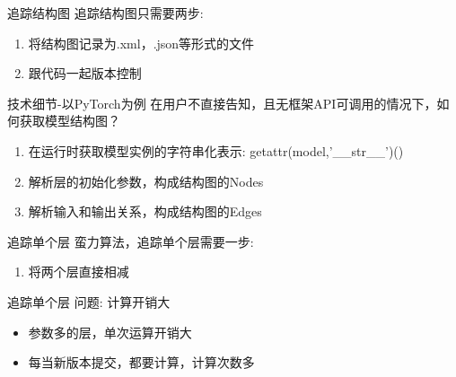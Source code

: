 \documentclass{beamer}
\begin{document}
\begin{frame}{追踪结构图}
追踪结构图只需要两步:
\begin{enumerate}
    \item 将结构图记录为.xml，.json等形式的文件
    \item 跟代码一起版本控制
\end{enumerate}
\end{frame}

\begin{frame}{技术细节-以PyTorch为例}
在用户不直接告知，且无框架API可调用的情况下，如何获取模型结构图？
\begin{enumerate}
    \item 在运行时获取模型实例的字符串化表示: {\small getattr(model,'\_\_str\_\_')()}
    \item 解析层的初始化参数，构成结构图的Nodes
    \item 解析输入和输出关系，构成结构图的Edges
\end{enumerate}
\end{frame}


\begin{frame}{追踪单个层}
蛮力算法，追踪单个层需要一步:
\begin{enumerate}
    \item 将两个层直接相减
\end{enumerate}
\end{frame}

\begin{frame}{追踪单个层}
问题: 计算开销大
\begin{itemize}
    \item 参数多的层，单次运算开销大
    \item 每当新版本提交，都要计算，计算次数多
\end{itemize}
\end{frame}
\end{document}
